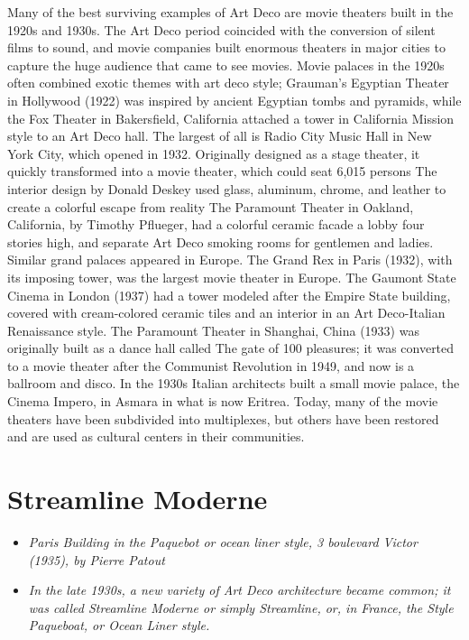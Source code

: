 Many of the best surviving examples of Art Deco are movie theaters built
in the 1920s and 1930s. The Art Deco period coincided with the
conversion of silent films to sound, and movie companies built enormous
theaters in major cities to capture the huge audience that came to see
movies. Movie palaces in the 1920s often combined exotic themes with art
deco style; Grauman's Egyptian Theater in Hollywood (1922) was inspired
by ancient Egyptian tombs and pyramids, while the Fox Theater in
Bakersfield, California attached a tower in California Mission style to
an Art Deco hall. The largest of all is Radio City Music Hall in New
York City, which opened in 1932. Originally designed as a stage theater,
it quickly transformed into a movie theater, which could seat 6,015
persons The interior design by Donald Deskey used glass, aluminum,
chrome, and leather to create a colorful escape from reality The
Paramount Theater in Oakland, California, by Timothy Pflueger, had a
colorful ceramic facade a lobby four stories high, and separate Art Deco
smoking rooms for gentlemen and ladies. Similar grand palaces appeared
in Europe. The Grand Rex in Paris (1932), with its imposing tower, was
the largest movie theater in Europe. The Gaumont State Cinema in London
(1937) had a tower modeled after the Empire State building, covered with
cream-colored ceramic tiles and an interior in an Art Deco-Italian
Renaissance style. The Paramount Theater in Shanghai, China (1933) was
originally built as a dance hall called The gate of 100 pleasures; it
was converted to a movie theater after the Communist Revolution in 1949,
and now is a ballroom and disco. In the 1930s Italian architects built a
small movie palace, the Cinema Impero, in Asmara in what is now Eritrea.
Today, many of the movie theaters have been subdivided into multiplexes,
but others have been restored and are used as cultural centers in their
communities.

\section{Streamline Moderne}\label{streamline-moderne}

\begin{itemize}
\item
  \emph{Paris Building in the Paquebot or ocean liner style, 3 boulevard
  Victor (1935), by Pierre Patout}
\item
  \emph{In the late 1930s, a new variety of Art Deco architecture became
  common; it was called Streamline Moderne or simply Streamline, or, in
  France, the Style Paqueboat, or Ocean Liner style.}
\end{itemize}

